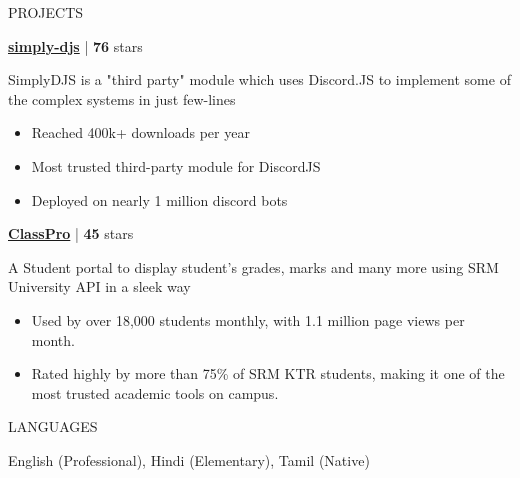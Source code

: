 \documentclass{resume}
\begin{document}
\begin{rSection}{PROJECTS}    
    \item \textbf{\href{https://github.com/Rahuletto/simply-djs}{simply-djs}} | \textbf{76} stars

SimplyDJS is a "third party" module which uses Discord.JS to implement some of the complex
systems in just few-lines

\begin{itemize}
\item Reached 400k+ downloads per year
\item Most trusted third-party module for DiscordJS
\item Deployed on nearly 1 million discord bots
\end{itemize}
\item \textbf{\href{https://github.com/Rahuletto/ClassPro}{ClassPro}} | \textbf{45} stars

A Student portal to display student's grades, marks and many more using SRM University API in a sleek way

\begin{itemize}
\item Used by over 18,000 students monthly, with 1.1 million page views per month.
\item Rated highly by more than 75\% of SRM KTR students, making it one of the most trusted academic tools on campus.
\end{itemize}

\end{rSection}
\vspace{1.5em}


\begin{rSection}{LANGUAGES}

\begin{itemize}
    English (Professional), Hindi (Elementary), Tamil (Native)
\end{itemize}

\end{rSection}



\end{document}

